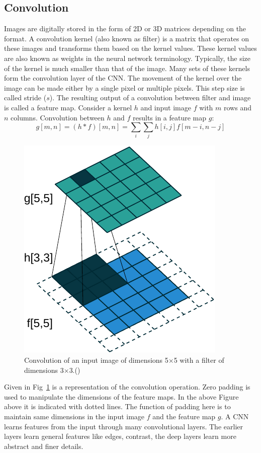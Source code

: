 \subsection{Convolution}

Images are digitally stored in the form of 2D or 3D matrices depending on the format. A convolution kernel (also known as filter) is a matrix that operates on these images and transforms them based on the kernel values. These kernel values are also known as weights in the neural network terminology. Typically, the size of the kernel is much smaller than that of the image. Many sets of these kernels form the convolution layer of the \ac{CNN}.  The movement of the kernel over the image can be made either by a single pixel or multiple pixels. This step size is called stride ($s$). The resulting output of a convolution between filter and image is called a feature map. Consider a kernel $h$ and input image $f$ with $m$ rows and $n$ columns. Convolution between $h$ and $f$ results in a feature map $g$: 
\begin{equation}
g[m, n]=(h * f)[m, n]=\sum_{i} \sum_{j} h[i, j] f[m-i, n-j]
\end{equation}

\begin{figure}[!htbp]
	\centering
	\includegraphics[width=0.4\linewidth]{./Figures/convol-crop.pdf}
	\caption{Convolution of an input image of dimensions 5$\times$5 with a filter of dimensions 3$\times$3.(\cite{dumoulin2016guide})}
	\label{fig:conv}
\end{figure}

Given in Fig~\ref{fig:conv} is a representation of the convolution operation. Zero padding is used to manipulate the dimensions of the feature maps. In the above Figure above it is indicated with dotted lines. The function of padding here is to maintain same dimensions in the input image $f$ and the feature map $g$. A \ac{CNN} learns features from the input through many convolutional layers. The earlier layers learn general features like edges, contrast, the deep layers learn more abstract and finer details.  

